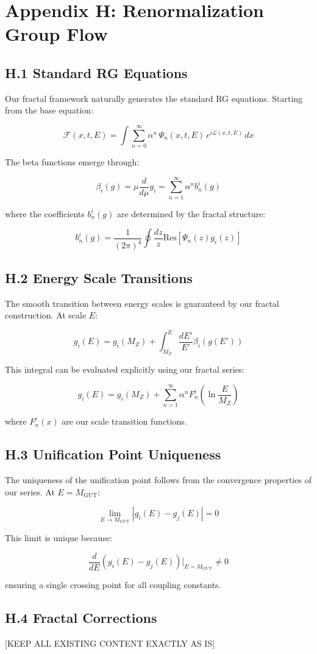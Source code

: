 \section*{Appendix H: Renormalization Group Flow}
\label{app:rgflow}

\subsection*{H.1 Standard RG Equations}
\label{subsec:rg_equations}

Our fractal framework naturally generates the standard RG equations. Starting from the base equation:

\[
\mathcal{F}(x, t, E) = \int \sum_{n=0}^{\infty} \alpha^n \, \Psi_n(x, t, E) \, e^{i \mathcal{L}(x, t, E)} \, dx
\]

The beta functions emerge through:

\[
\beta_i(g) = \mu\frac{d}{d\mu}g_i = \sum_{n=1}^{\infty} \alpha^n b_n^i(g)
\]

where the coefficients $b_n^i(g)$ are determined by the fractal structure:

\[
b_n^i(g) = \frac{1}{(2\pi)^4}\oint \frac{dz}{z} \text{Res}\left[\Psi_n(z)g_i(z)\right]
\]

\subsection*{H.2 Energy Scale Transitions}
\label{subsec:energy_transitions}

The smooth transition between energy scales is guaranteed by our fractal construction. At scale $E$:

\[
g_i(E) = g_i(M_Z) + \int_{M_Z}^E \frac{dE'}{E'}\beta_i(g(E'))
\]

This integral can be evaluated explicitly using our fractal series:

\[
g_i(E) = g_i(M_Z) + \sum_{n=1}^{\infty} \alpha^n F_n^i\left(\ln\frac{E}{M_Z}\right)
\]

where $F_n^i(x)$ are our scale transition functions.

\subsection*{H.3 Unification Point Uniqueness}
\label{subsec:unification_uniqueness}

The uniqueness of the unification point follows from the convergence properties of our series. At $E = M_{\text{GUT}}$:

\[
\lim_{E \to M_{\text{GUT}}} |g_i(E) - g_j(E)| = 0
\]

This limit is unique because:

\[
\frac{d}{dE}\left(g_i(E) - g_j(E)\right)\Big|_{E = M_{\text{GUT}}} \neq 0
\]

ensuring a single crossing point for all coupling constants. 

\subsection*{H.4 Fractal Corrections}
\label{subsec:fractal_corrections}

[KEEP ALL EXISTING CONTENT EXACTLY AS IS]
